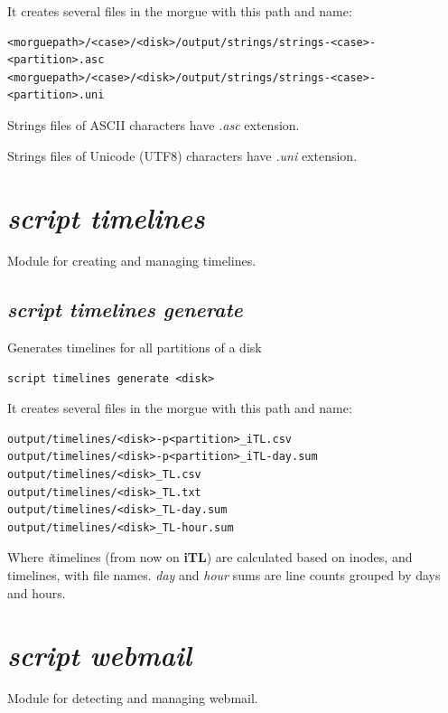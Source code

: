 \documentclass[a4paper,11pt,oneside]{report}
\begin{document}
It creates several files in the morgue with this path and name:

\begin{verbatim}
<morguepath>/<case>/<disk>/output/strings/strings-<case>-<partition>.asc
<morguepath>/<case>/<disk>/output/strings/strings-<case>-<partition>.uni
\end{verbatim}

Strings files of ASCII characters have \emph{.asc} extension.

Strings files of Unicode (UTF8) characters have \emph{.uni} extension.





\section{\emph{script timelines}}

Module for creating and managing timelines.

\subsection{\emph{script timelines generate}} 

Generates timelines for all partitions of a disk

\begin{verbatim}
script timelines generate <disk>
\end{verbatim}

It creates several files in the morgue with this path and name:

\begin{verbatim}
output/timelines/<disk>-p<partition>_iTL.csv
output/timelines/<disk>-p<partition>_iTL-day.sum
output/timelines/<disk>_TL.csv
output/timelines/<disk>_TL.txt
output/timelines/<disk>_TL-day.sum
output/timelines/<disk>_TL-hour.sum
\end{verbatim}

Where \emph{i}timelines (from now on \textbf{iTL}) are calculated based on inodes, and timelines, with file names. \emph{day} and \emph{hour} sums are line counts grouped by days and hours.




\section{\emph{script webmail}}

Module for detecting and managing webmail.
\end{document}
